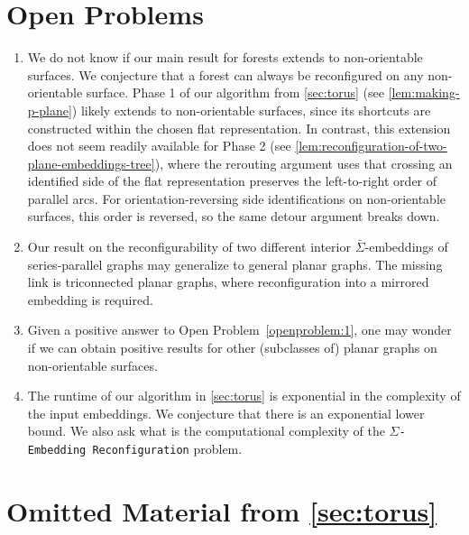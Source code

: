 \documentclass[a4paper,USenglish,cleveref,colorlinks=true,urlcolor=black,linkcolor=black,citecolor=black,thm-restate,authorcolumns]{lipics-v2021}
\theoremstyle{claimstyle}
\begin{document}
\section{Open Problems}
\label{sec:open}
\begin{enumerate}
    \item\label{openproblem:1} We do not know if our main result for forests extends to non-orientable surfaces.
    We conjecture that a forest can always be reconfigured on any non-orientable surface.
    Phase 1 of our algorithm from \cref{sec:torus} (see \cref{lem:making-p-plane}) likely extends to non-orientable surfaces, since its shortcuts are constructed within the chosen flat representation. %
    In contrast, this extension does not seem readily available for Phase 2 (see \cref{lem:reconfiguration-of-two-plane-embeddings-tree}),
    where the rerouting argument uses that crossing an identified side of the flat representation preserves the left-to-right order of parallel arcs.
    For orientation-reversing side identifications on non-orientable surfaces, this order is reversed, so the same detour argument breaks down.
    \item\label{openproblem:2} Our result on the reconfigurability of two different interior $\bar{\Sigma}$-embeddings of series-parallel graphs may generalize to
          general planar graphs.
    The missing link is triconnected planar graphs, where reconfiguration into a mirrored embedding is required.
    \item\label{openproblem:3} Given a positive answer to Open Problem~\ref{openproblem:1}, one may wonder if we can obtain positive results for other (subclasses of) planar graphs on non-orientable surfaces.
    \item The runtime of our algorithm in \cref{sec:torus} is exponential in the complexity of the input embeddings.
    We conjecture that there is an exponential lower bound.
    We also ask what is the computational complexity of the \texttt{$\Sigma$-Embedding Reconfiguration} problem.
\end{enumerate}




\newpage


\appendix


\section{Omitted Material from \cref{sec:torus}}
\label{app:torus}
\end{document}
